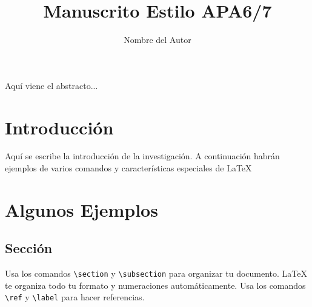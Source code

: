 \documentclass[doc, 12pt, letterpaper, donotrepeattitle, floatsintext, apacite]{apa6}    %
\title{\Large Manuscrito Estilo APA6/7}
\author{Nombre del Autor}
\affiliation{Nombre de Organización\\ Materia en Curso\\ Código: 123456789}
\newcommand{\latex}{\LaTeX\xspace}  %
\begin{document}
\vspace*{-2cm}      %
\maketitle          %


\doublespacing %

Aquí viene el abstracto...


\section{\large Introducción}
Aquí se escribe la introducción de la investigación. A continuación habrán ejemplos de varios comandos y características especiales de \latex

\section{\large Algunos Ejemplos}

\subsection{Sección}
Usa los comandos \verb|\section| y \verb|\subsection| para organizar tu documento. \latex te organiza todo tu formato y numeraciones automáticamente. Usa los comandos \verb|\ref| y \verb|\label| para hacer referencias.
\end{document}

